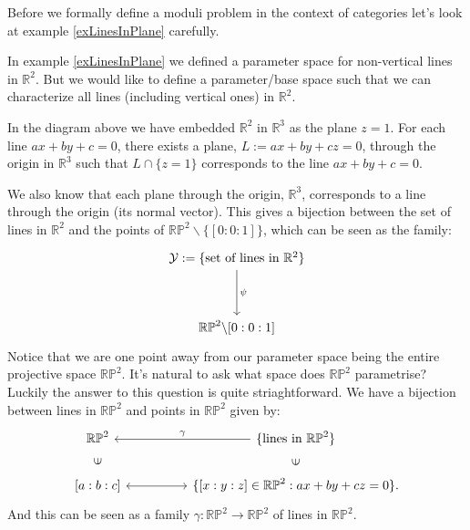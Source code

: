 Before we formally define a moduli problem in the context of categories let's look at example \ref{exLinesInPlane} carefully.
\begin{example}
    \label{compExLinesInplane}
    In example \ref{exLinesInPlane} we defined a parameter space for non-vertical lines in $\mathbb{R}^{2}$. 
    But we would like to define a parameter/base space such that we can characterize all lines (including vertical ones) in $\mathbb{R}^{2}$.
    \par In the diagram above we have embedded $\mathbb{R}^{2}$ in $\mathbb{R}^{3}$ as the plane $z = 1$.
    For each line $ax + by + c = 0 $, there exists a plane, $L := ax + by + cz = 0$,  through the origin in $\mathbb{R}^{3}$ such that $L \cap \{z=1\}$ corresponds to the line $ax + by + c = 0 $.
    \par We also know that each plane through the origin, $\mathbb{R}^{3}$, corresponds to a line through the origin (its normal vector). 
    This gives a bijection between the set of lines in $\mathbb{R}^{2}$ and the points of $\mathbb{RP}^{2}\backslash \{ [0:0:1]\}$, which can be seen as the family:
    \[
        \begin{tikzcd}
            \mathcal{Y} := \{\text{set of lines in } \mathbb{R}^{2}\}\\
            \\
            \mathbb{RP}^{2}\backslash {[0:0:1]}
            \arrow["\psi", from = 1-1, to = 3-1]
        \end{tikzcd}
    \]
    Notice that we are one point away from our parameter space being the entire projective space $\mathbb{RP}^{2}$.
    It's natural to ask what space does $\mathbb{RP}^{2}$ parametrise?
    Luckily the answer to this question is quite striaghtforward.
    We have a bijection between lines in $\mathbb{RP}^{2}$ and points in $\mathbb{RP}^{2}$ given by:
    \[
        \begin{tikzcd}
            {\mathbb{RP}^{2}} & & {\{\text{lines in }\mathbb{RP}^{2}\}} \\
            {[a:b:c]} \arrow[u, phantom, sloped, "\in"]& & {\{[x:y:z] \in \mathbb{RP}^{2}: ax + by + cz = 0 \}}\arrow[u, phantom, sloped, "\in"].
            \arrow["\gamma", leftarrow, from = 1-1, to = 1-3]
            \arrow[ leftrightarrow, from = 2-1, to = 2-3]
        \end{tikzcd}
    \]
    And this can be seen as a family $\gamma : \mathbb{RP}^{2}\to \mathbb{RP}^{2}$ of lines in $\mathbb{RP}^{2}$.

\end{example}
